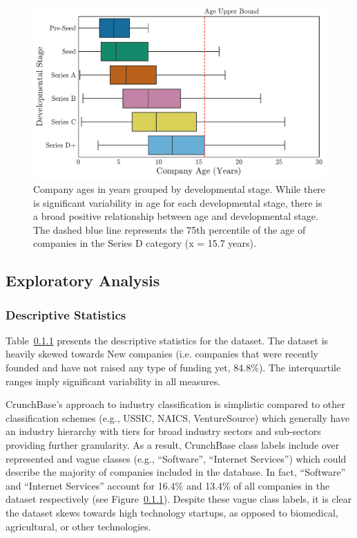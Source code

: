 \documentclass[../thesis/thesis.tex]{subfiles}
\begin{document}
\begin{figure}[!htb]
    \centering
    \includegraphics[width=\textwidth]{../figures/design/stages_ages}
    \caption{Company ages in years grouped by developmental stage. While there is significant variability in age for each developmental stage, there is a broad positive relationship between age and developmental stage. The dashed blue line represents the 75th percentile of the age of companies in the Series D\+ category (x = 15.7 years).}
    \label{fig:design:stages_ages}
\end{figure}

\subsection{Exploratory Analysis}

\subsubsection{Descriptive Statistics}

Table~\ref{} presents the descriptive statistics for the dataset. The dataset is heavily skewed towards New companies (i.e. companies that were recently founded and have not raised any type of funding yet, 84.8\%). The interquartile ranges imply significant variability in all measures.


CrunchBase's approach to industry classification is simplistic compared to other classification schemes (e.g., USSIC, NAICS, VentureSource) which generally have an industry hierarchy with tiers for broad industry sectors and sub-sectors providing further granularity. As a result, CrunchBase class labels include over represented and vague classes (e.g., ``Software'', ``Internet Services'') which could describe the majority of companies included in the database. In fact, ``Software'' and ``Internet Services'' account for 16.4\% and 13.4\% of all companies in the dataset respectively (see Figure~\ref{}). Despite these vague class labels, it is clear the dataset skews towards high technology startups, as opposed to biomedical, agricultural, or other technologies.
\end{document}
